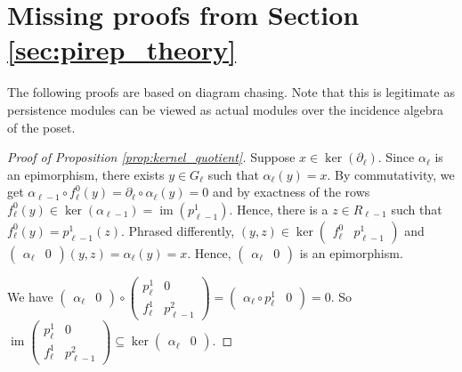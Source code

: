 \documentclass[english,a4paper,nolineno,cleveref]{socg-lipics-v2021}
\DeclareMathOperator{\im}{im}
\begin{document}
\section{Missing proofs from Section \ref{sec:pirep_theory}} \label{app:proofs}

The following proofs are based on diagram chasing. Note that this is legitimate as persistence modules can be viewed as actual modules over the incidence algebra of the poset.

\begin{proof}[Proof of Proposition \ref{prop:kernel_quotient}]
Suppose $x\in \ker(\partial_\ell)$. Since $\alpha_\ell$ is an epimorphism, there exists $y\in G_\ell$ such that $\alpha_\ell(y)=x$. By commutativity, we get $\alpha_{\ell\minus 1}\circ f^0_\ell(y)=\partial_\ell\circ \alpha_\ell(y)=0$ and by exactness of the rows $f^0_\ell(y)\in \ker(\alpha_{\ell\minus 1})=\im(p_{\ell\minus 1}^1)$. Hence, there is a $z\in R_{\ell\minus 1}$ such that $f^0_\ell(y)=p^1_{\ell\minus 1}(z)$. Phrased differently, $(y,z)\in \ker\begin{pmatrix}f^0_\ell & p_{\ell\minus 1}^1\end{pmatrix}$ and $\begin{pmatrix}\alpha_\ell & 0\end{pmatrix}(y,z)=\alpha_\ell(y)=x$. Hence, $\begin{pmatrix}\alpha_\ell & 0\end{pmatrix}$ is an epimorphism. 

We have $\begin{pmatrix}\alpha_\ell & 0\end{pmatrix}\circ\begin{pmatrix}p_\ell^1 & 0 \\ f_\ell^1 & p_{\ell\minus 1}^2\end{pmatrix}=\begin{pmatrix}\alpha_\ell\circ p_\ell^1 & 0\end{pmatrix}=0$. So $\im\begin{pmatrix}p_\ell^1 & 0 \\ f^1_\ell & p_{\ell\minus 1}^2\end{pmatrix}\subseteq \ker\begin{pmatrix}\alpha_\ell & 0\end{pmatrix}$.


\end{proof}
\end{document}

